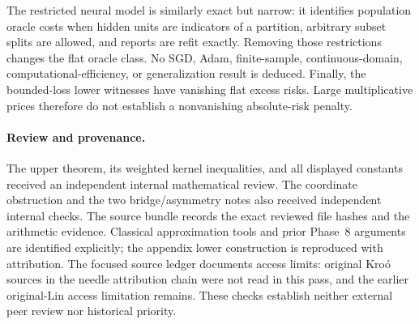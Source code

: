 \documentclass[11pt]{article}
\theoremstyle{definition}\newtheorem{definition}[theorem]{Definition}
\theoremstyle{remark}\newtheorem{remark}[theorem]{Remark}
\begin{document}
The restricted neural model is similarly exact but narrow: it identifies
population oracle costs when hidden units are indicators of a partition,
arbitrary subset splits are allowed, and reports are refit exactly.
Removing those restrictions changes the flat oracle class. No SGD,
Adam, finite-sample, continuous-domain, computational-efficiency, or
generalization result is deduced. Finally, the bounded-loss lower witnesses
have vanishing flat excess risks. Large multiplicative prices therefore
do not establish a nonvanishing absolute-risk penalty.

\paragraph{Review and provenance.}
The upper theorem, its weighted kernel inequalities, and all displayed
constants received an independent internal mathematical review. The
coordinate obstruction and the two bridge/asymmetry notes also received
independent internal checks. The source bundle records the exact reviewed
file hashes and the arithmetic evidence. Classical approximation tools and
prior Phase~8 arguments are identified explicitly; the appendix lower
construction is reproduced with attribution. The focused source ledger
documents access limits: original Kro\'o sources in the needle attribution
chain were not read in this pass, and the earlier original-Lin access
limitation remains. These checks establish neither external peer review
nor historical priority.

\appendix



\end{document}
